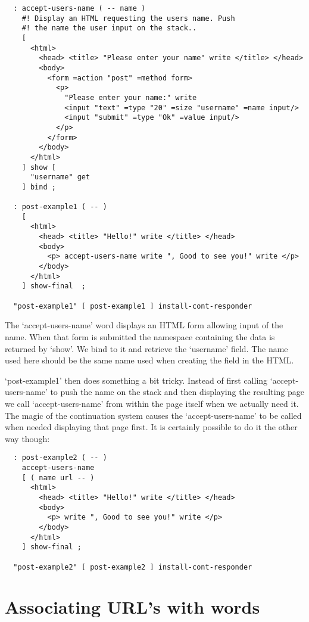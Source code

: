 \begin{verbatim}
  : accept-users-name ( -- name )
    #! Display an HTML requesting the users name. Push
    #! the name the user input on the stack..
    [
      <html>
        <head> <title> "Please enter your name" write </title> </head>
        <body>
          <form =action "post" =method form>
            <p> 
              "Please enter your name:" write
              <input "text" =type "20" =size "username" =name input/>
              <input "submit" =type "Ok" =value input/>
            </p>
          </form>
        </body>
      </html>
    ] show [
      "username" get
    ] bind ;

  : post-example1 ( -- )
    [
      <html>
        <head> <title> "Hello!" write </title> </head>
        <body>
          <p> accept-users-name write ", Good to see you!" write </p>
        </body>
      </html>
    ] show-final  ;
    
  "post-example1" [ post-example1 ] install-cont-responder
\end{verbatim}
    
The `accept-users-name' word displays an HTML form allowing input of
the name. When that form is submitted the namespace containing the
data is returned by `show'. We bind to it and retrieve the `username'
field. The name used here should be the same name used when creating
the field in the HTML.

`post-example1' then does something a bit tricky. Instead of first
calling `accept-users-name' to push the name on the stack and then
displaying the resulting page we call `accept-users-name' from within
the page itself when we actually need it. The magic of the
continuation system causes the `accept-users-name' to be called when
needed displaying that page first. It is certainly possible to do it
the other way though:

\begin{verbatim}
  : post-example2 ( -- )
    accept-users-name
    [ ( name url -- )
      <html>
        <head> <title> "Hello!" write </title> </head>
        <body>
          <p> write ", Good to see you!" write </p>
        </body>
      </html>
    ] show-final ;

  "post-example2" [ post-example2 ] install-cont-responder
\end{verbatim}

\section{Associating URL's with words}

